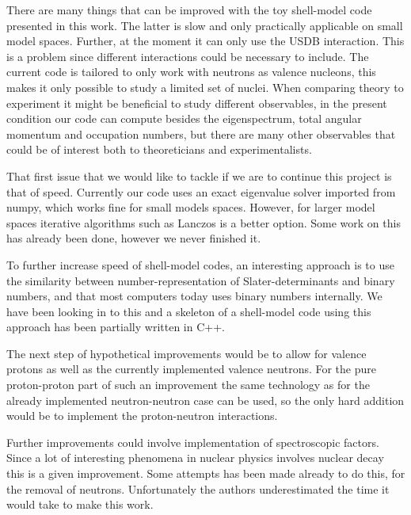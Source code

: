 There are many things that can be improved with the toy shell-model code presented in this work. The latter is slow and only practically applicable on small model spaces. Further, at the moment it can only use the USDB interaction. This is a problem since different interactions could be necessary to include. The current code is tailored to only work with neutrons as valence nucleons, this makes it only possible to study a limited set of nuclei. When comparing theory to experiment it might be beneficial to study different observables, in the present condition our code can compute besides the eigenspectrum, total angular momentum and occupation numbers, but there are many other observables that could be of interest both to theoreticians and experimentalists.

That first issue that we would like to tackle if we are to continue this project is that of speed.
Currently our code uses an exact eigenvalue solver imported from numpy, which works fine for small models spaces. However, for larger model spaces iterative algorithms such as Lanczos is a better option. Some work on this has already been done, however we never finished it.

To further increase speed of shell-model codes, an interesting approach is to use the similarity between number-representation of Slater-determinants and binary numbers, and that most computers today uses binary numbers internally. We have been looking in to this and a skeleton of a shell-model code using this approach has been partially written in C++.

The next step of hypothetical improvements would be to allow for valence protons as well as the currently implemented valence neutrons. For the pure proton-proton part of such an improvement the same technology as for the already implemented neutron-neutron case can be used, so the only hard addition would be to implement the proton-neutron interactions.

Further improvements could involve implementation of spectroscopic factors. Since a lot of interesting phenomena in  nuclear physics involves nuclear decay this is a given improvement. Some attempts has been made already to do this, for the removal of neutrons. Unfortunately the authors underestimated the time it would take to make this work.

